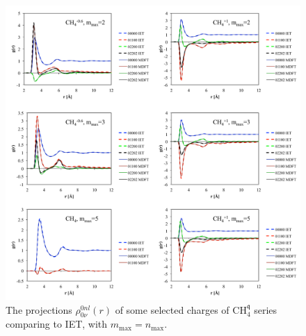 \begin{figure}[!t]
\begin{centering}
\includegraphics[width=1\columnwidth]{_figure/results/ch4_iet_struct}
\par\end{centering}
\caption[The projections $\rho_{0\nu}^{0nl}(r)$ of some selected charges of
$\mathrm{C}\mathrm{H}_{4}^{\mathfrak{q}}$ series comparing to \acs{IET}]{The projections $\rho_{0\nu}^{0nl}(r)$ of some selected charges
of $\mathrm{C}\mathrm{H}_{4}^{\mathfrak{q}}$ series comparing to
\acs{IET}, with $m_{\max}=n_{\max}$.\label{fig:Comparison-to-IET.rot_invar}}
\end{figure}

